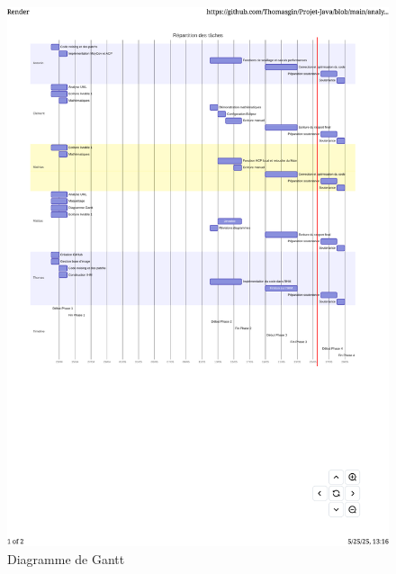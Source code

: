  \begin{figure}[hbt!]
     \centering
     \includegraphics[page=1, trim=1cm 10cm 1cm 1cm, clip, width=1\linewidth]{reference/diagram/ganttTemp.pdf}
     \caption{Diagramme de Gantt}
     \label{fig:gantt}
 \end{figure}